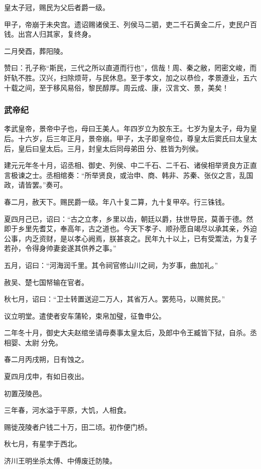 \documentclass[]{article}
\begin{document}
皇太子冠，赐民为父后者爵一级。

甲子，帝崩于未央宫。遗诏赐诸侯王、列侯马二驷，吏二千石黄金二斤，吏民户百钱。出宫人归其家，复终身。

二月癸酉，葬阳陵。

赞曰：孔子称``斯民，三代之所以直道而行也''，信哉！周、秦之敝，罔密文峻，而奸轨不胜。汉兴，扫除烦苛，与民休息。至于孝文，加之以恭俭，孝景遵业，五六十载之间，至于移风易俗，黎民醇厚。周云成、康，汉言文、景，美矣！

\hypertarget{header-n373}{%
\subsubsection{武帝纪}\label{header-n373}}

孝武皇帝，景帝中子也，母曰王美人。年四岁立为胶东王。七岁为皇太子，母为皇后。十六岁，后三年正月，景帝崩。甲子，太子即皇帝位，尊皇太后窦氏曰太皇太后，皇后曰皇太后。三月，封皇太后同母弟田分、胜皆为列侯。

建元元年冬十月，诏丞相、御史、列侯、中二千石、二千石、诸侯相举贤良方正直言极谏之士。丞相绾奏：``所举贤良，或治申、商、韩非、苏秦、张仪之言，乱国政，请皆罢。''奏可。

春二月，赦天下。赐民爵一级。年八十复二算，九十复甲卒。行三铢钱。

夏四月己已，诏曰：``古之立孝，乡里以齿，朝廷以爵，扶世导民，莫善于德。然即于乡里先耆艾，奉高年，古之道也。今天下孝子、顺孙愿自竭尽以承其亲，外迫公事，内乏资财，是以孝心阙焉，朕甚哀之。民年九十以上，已有受鬻法，为复子若孙，令得身帅妻妾遂其供养之事。''

五月，诏曰：``河海润千里。其令祠官修山川之祠，为岁事，曲加礼。''

赦吴、楚七国帑输在官者。

秋七月，诏曰：``卫士转置送迎二万人，其省万人。罢苑马，以赐贫民。''

议立明堂。遣使者安车蒲轮，束帛加璧，征鲁申公。

二年冬十月，御史大夫赵绾坐请毋奏事太皇太后，及郎中令王臧皆下狱，自杀。丞相婴、太尉分免。

春二月丙戌朔，日有蚀之。

夏四月戊申，有如日夜出。

初置茂陵邑。

三年春，河水溢于平原，大饥，人相食。

赐徙茂陵者户钱二十万，田二顷。初作便门桥。

秋七月，有星孛于西北。

济川王明坐杀太傅、中傅废迁防陵。
\end{document}
